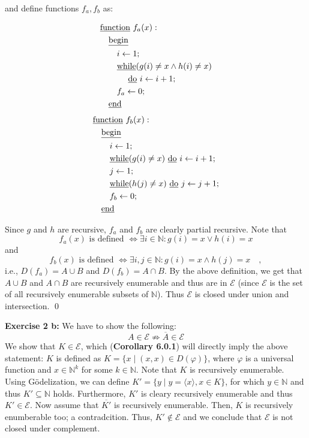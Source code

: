 \documentclass [11pt]{article}
\newcommand{\E}{\ensuremath{\mathcal{E}}}
\newcommand{\N}{\ensuremath{\mathbb{N}}}
\begin{document}
\noindent
and define functions $f_a, f_b$ as:
\begin{multicols}{2}
\noindent
\begin{align*}
& \text{\underline{function} } f_a(x): \\
& \quad \text{\underline{begin}} \\
& \quad \quad i \leftarrow 1; \\
& \quad \quad \text{\underline{while}} (g(i) \neq x \land h(i) \neq x) \\
& \quad \quad \quad \text{ \underline{do} } i \leftarrow i +1; \\
& \quad \quad f_a \leftarrow 0; \\
& \quad \text{\underline{end}}
\end{align*}
\begin{align*}
& \text{\underline{function} } f_b(x): \\
& \quad \text{\underline{begin}} \\
& \quad \quad i \leftarrow 1; \\
& \quad \quad \text{\underline{while}} (g(i) \neq x) \text{ \underline{do} } i \leftarrow i + 1; \\
& \quad \quad j \leftarrow 1; \\
& \quad \quad \text{\underline{while}} (h(j) \neq x) \text{ \underline{do} } j \leftarrow j + 1; \\
& \quad \quad f_b \leftarrow 0; \\
& \quad \text{\underline{end}}
\end{align*}
\end{multicols}
\noindent
Since $g$ and $h$ are recursive, $f_a$ and $f_b$ are clearly partial recursive. 
Note that 
$$
f_a(x) \text{ is defined } \iff \exists i \in \N: g(i) = x \lor h(i) = x
$$
and 
$$
f_b(x) \text{ is defined } \iff \exists i,j \in \N: g(i) = x \land h(j) = x \quad ,
$$
i.e., $D(f_a) = A \cup B$ and $D(f_b) = A \cap B$.
By the above definition, we get that $A\cup B$ and $A \cap B$ are recursively enumerable and thus are in $\E$ (since $\E$ is the set of all recursively enumerable subsets of \N). 
Thus $\E$ is closed under union and intersection. \qed

\bigskip
\noindent
\textbf{Exercise 2 b:} 
We have to show the following:
$$
A \in \E \not \Rightarrow \overline{A} \in \E
$$
We show that $K \in \E$, which (\textbf{Corollary 6.0.1}) will directly imply the above statement:
$K$ is defined as $ K = \{x\mid (x,x) \in D(\varphi) \}$, where $\varphi$ is a universal function and $x \in \N^k$ for some $k \in \N$. 
Note that $K$ is recursively enumerable.
Using G\"odelization, we can define $K' = \{y \mid y = \langle x\rangle, x \in K \}$, for which $y \in \N$ and thus $K'\subseteq \N$ holds.
Furthermore, $K'$ is cleary recursively enumerable and thus $K' \in \E$.
Now assume that $\overline{K'}$ is recursively enumerable. 
Then, $K$ is recursively enumberable too; a contradcition.
Thus, $K' \not \in \E$ and we conclude that $\E$ is not closed under complement.
\end{document}
